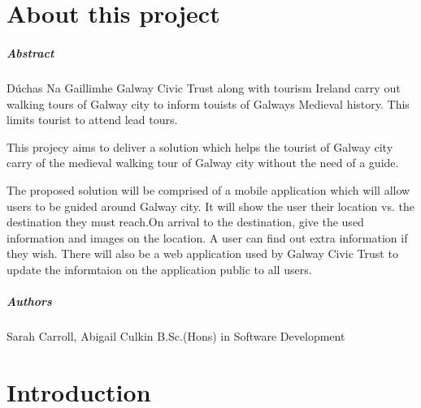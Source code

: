 
\chapter*{About this project}
\paragraph{Abstract}

Dúchas Na Gaillimhe Galway Civic Trust along with tourism Ireland carry out walking tours of Galway city to inform touists of Galways Medieval history. This limits tourist to attend lead tours.

This projecy aims to deliver a solution which helps the tourist of Galway city carry of the medieval walking tour of Galway city without the need of a guide.

The proposed solution will be comprised of a mobile application which will allow users to be guided around Galway city. It will show the user their location vs. the destination they must reach.On arrival to the destination, give the used information and images on the location. A user can find out extra information if they wish. There will also be a web application used by Galway Civic Trust to update the informtaion on the application public to all users.

\paragraph{Authors}
Sarah Carroll, Abigail Culkin
B.Sc.(Hons) in Software Development



\chapter{Introduction}